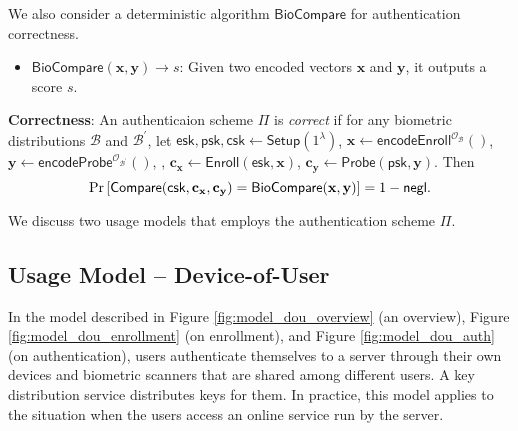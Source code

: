 \noindent We also consider a deterministic algorithm $\textsf{BioCompare}$ for authentication correctness.

\begin{itemize}

	\item $\textsf{BioCompare}(\mathbf{x}, \mathbf{y}) \to s$: Given two encoded vectors $\mathbf{x}$ and $\mathbf{y}$, it outputs a score $s$. 

\end{itemize}

\noindent \textbf{Correctness}: An authenticaion scheme $\Pi$ is \emph{correct} if for any biometric distributions $\mathcal{B}$ and $\mathcal{B}^\prime$, let $\textsf{esk}, \textsf{psk}, \textsf{csk} \gets \textsf{Setup}(1^\lambda)$, $\mathbf{x} \gets \textsf{encodeEnroll}^{\mathcal{O}_\mathcal{B}}()$, $\mathbf{y} \gets \textsf{encodeProbe}^{\mathcal{O}_{\mathcal{B}^\prime}}()$, , $\mathbf{c_x} \gets \textsf{Enroll}(\textsf{esk}, \mathbf{x})$, $\mathbf{c_y} \gets \textsf{Probe}(\textsf{psk}, \mathbf{y})$. Then
	\[
		\Pr \left [
			\textsf{Compare}(\textsf{csk}, \mathbf{c_x}, \mathbf{c_y}) = \textsf{BioCompare}(\mathbf{x}, \mathbf{y})
		\right ] = 1 - \mathsf{negl}.
	\]


We discuss two usage models that employs the authentication scheme $\Pi$.




\subsection{Usage Model – Device-of-User}
\label{sec:dou_model}

In the model described in Figure \ref{fig:model_dou_overview} (an overview), Figure \ref{fig:model_dou_enrollment} (on enrollment), and Figure \ref{fig:model_dou_auth} (on authentication), users authenticate themselves to a server through their own devices and biometric scanners that are shared among different users.
A key distribution service distributes keys for them. In practice, this model applies to the situation when the users access an online service run by the server.

